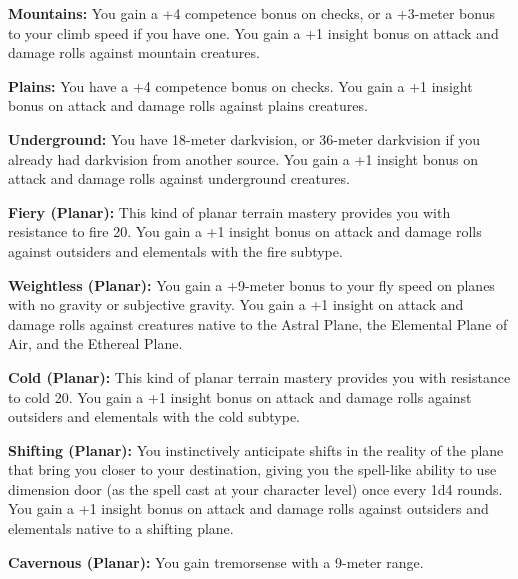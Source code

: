 {\textbf{Mountains:} You gain a +4 competence bonus on  checks, or a +3-meter bonus to your climb speed if you have one. You gain a +1 insight bonus on attack and damage rolls against mountain creatures.

\textbf{Plains:} You have a +4 competence bonus on  checks. You gain a +1 insight bonus on attack and damage rolls against plains creatures.

\textbf{Underground:} You have 18-meter darkvision, or 36-meter darkvision if you already had darkvision from another source. You gain a +1 insight bonus on attack and damage rolls against underground creatures.

\textbf{Fiery (Planar):} This kind of planar terrain mastery provides you with resistance to fire 20. You gain a +1 insight bonus on attack and damage rolls against outsiders and elementals with the fire subtype.

\textbf{Weightless (Planar):} You gain a +9-meter bonus to your fly speed on planes with no gravity or subjective gravity. You gain a +1 insight on attack and damage rolls against creatures native to the Astral Plane, the Elemental Plane of Air, and the Ethereal Plane.

\textbf{Cold (Planar):} This kind of planar terrain mastery provides you with resistance to cold 20. You gain a +1 insight bonus on attack and damage rolls against outsiders and elementals with the cold subtype.

\textbf{Shifting (Planar):} You instinctively anticipate shifts in the reality of the plane that bring you closer to your destination, giving you the spell-like ability to use dimension door (as the spell cast at your character level) once every 1d4 rounds. You gain a +1 insight bonus on attack and damage rolls against outsiders and elementals native to a shifting plane.

\textbf{Cavernous (Planar):} You gain tremorsense with a 9-meter range.
}
